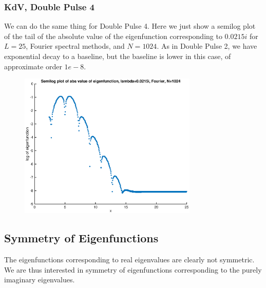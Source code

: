 \documentclass[12pt]{article}
\begin{document}
\subsubsection*{KdV, Double Pulse 4}
We can do the same thing for Double Pulse 4. Here we just show a semilog plot of the tail of the absolute value of the eigenfunction corresponding to $0.0215i$ for $L = 25$, Fourier spectral methods, and $N = 1024$. As in Double Pulse 2, we have exponential decay to a baseline, but the baseline is lower in this case, of approximate order $1e-8$.

\begin{figure}[H]
\includegraphics[width=8.5cm]{4doublesemilogeigenfn}
\end{figure}

\subsection*{Symmetry of Eigenfunctions}
The eigenfunctions corresponding to real eigenvalues are clearly not symmetric. We are thus interested in symmetry of eigenfunctions corresponding to the purely imaginary eigenvalues.
\end{document}
